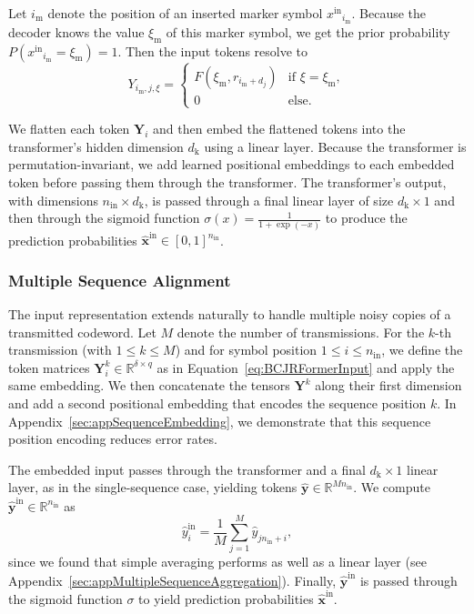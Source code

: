 \documentclass[conference,letterpaperu]{IEEEtran}
\newcommand{\yinIx}{\ensuremath{x^{\text{in}}}}
\newcommand{\Yval}{\ensuremath{\xi}}
\newcommand{\nin}{\ensuremath{n_{\text{in}}}}
\newcommand{\predyin}{\ensuremath{\bm{\hat{x}}^{\text{in}}}}
\newcommand{\recIx}{\ensuremath{r}}
\newcommand{\bcjrformerInput}{\ensuremath{\bm{Y}}}
\newcommand{\bcjrformerInputIx}{\ensuremath{Y}}
\newcommand{\hiddenDim}{\ensuremath{d_{\text{k}}}}
\begin{document}
Let $i_{\text{m}}$ denote the position of an inserted marker symbol \( \yinIx_{i_{\text{m}}} \). Because the decoder knows the value \( \Yval_{\text{m}} \) of this marker symbol, we get the prior probability \( P(\yinIx_{i_{\text{m}}} = \Yval_{\text{m}}) = 1 \). Then the input tokens resolve to
$$
 \bcjrformerInputIx_{i_{\text{m}},j, \Yval} = \begin{cases}
     F(\Yval_{\text{m}}, \recIx_{i_{\text{m}} + d_j}) &\text{if } \Yval = \Yval_{\text{m}}, \\
     0 & \text{else.}
 \end{cases}
$$

We flatten each token \( \bcjrformerInput_{i} \) and then embed the flattened tokens into the transformer's hidden dimension \( \hiddenDim \) using a linear layer. Because the transformer is permutation-invariant, we add learned positional embeddings to each embedded token before passing them through the transformer. The transformer's output, with dimensions \( \nin \times \hiddenDim \), is passed through a final linear layer of size \( \hiddenDim \times 1 \) and then through the sigmoid function \( \sigma(x) = \frac{1}{1 + \exp(-x)} \) to produce the prediction probabilities \( \predyin \in [0, 1]^{\nin}\).


\subsubsection{Multiple Sequence Alignment}
\label{sec:bcjrformer-msa}
The input representation extends naturally to handle multiple noisy copies of a transmitted codeword. Let \( M \) denote the number of transmissions. For the $k$-th transmission (with \( 1 \leq k \leq M \)) and for symbol position $1\leq i \leq \nin$, we define the token matrices \( \bcjrformerInput_i^k \in \mathbb{R}^{\delta \times q}\) as in Equation~\eqref{eq:BCJRFormerInput} and apply the same embedding. We then concatenate the tensors $\bcjrformerInput^k$ along their first dimension and add a second positional embedding that encodes the sequence position $k$. In Appendix~\ref{sec:appSequenceEmbedding}, we demonstrate that this sequence position encoding reduces error rates. 

The embedded input passes through the transformer and a final \( \hiddenDim \times 1 \) linear layer, as in the single-sequence case, yielding tokens $\bm{\hat{y}} \in \mathbb{R}^{M\nin}$. We compute \( \bm{\hat{y}}^{\text{in}} \in \mathbb{R}^{\nin} \) as
\begin{equation}
    \label{eq:mean_dim_reduction}
    \hat{y}^{\text{in}}_i = \frac{1}{M} \sum_{j=1}^M \hat{y}_{j\nin + i},
\end{equation}
since we found that simple averaging performs as well as a linear layer (see Appendix~\ref{sec:appMultipleSequenceAggregation}). 
Finally, \( \bm{\hat{y}}^{\text{in}} \) is passed through the sigmoid function $\sigma$ to yield prediction probabilities $\predyin$.
\end{document}
